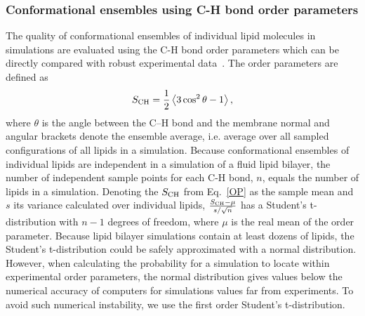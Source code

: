 \documentclass[fleqn,10pt]{wlscirep}
\begin{document}
\subsubsection{Conformational ensembles using C-H bond order parameters}
The quality of conformational ensembles of individual lipid molecules in simulations are evaluated using the C-H bond order parameters which can be directly compared with robust experimental data~\cite{ollila16}.
The order parameters are defined as
\begin{equation}\label{OP}
S_{\rm CH}=\frac{1}{2}\left\langle 3\cos^2\theta -1 \right\rangle,
\end{equation}
where $\theta$ is the angle between the C--H bond and the membrane normal
and angular brackets denote the ensemble average, i.e. average over all sampled configurations of all lipids in a simulation.
Because conformational ensembles of individual lipids are independent in a simulation of a fluid lipid bilayer, the number of independent sample points for each C-H bond, $n$, equals the number of lipids in a simulation. Denoting the $S_{\rm CH}$ from Eq.~\ref{OP} as the sample mean and $s$ its variance calculated over individual lipids, 
$\frac{S_{\rm CH}-\mu}{s/\sqrt{n}}$
has a Student's t-distribution with $n-1$ degrees of freedom, where $\mu$ is the real mean of the order parameter. 
Because lipid bilayer simulations contain at least dozens of lipids, the Student's t-distribution could be safely approximated with a normal distribution. However, when calculating the probability for a simulation to locate within experimental order parameters, the normal distribution gives values below the numerical accuracy of computers for simulations values far from experiments. To avoid such numerical instability, we use the first order Student's t-distribution.%
\end{document}
